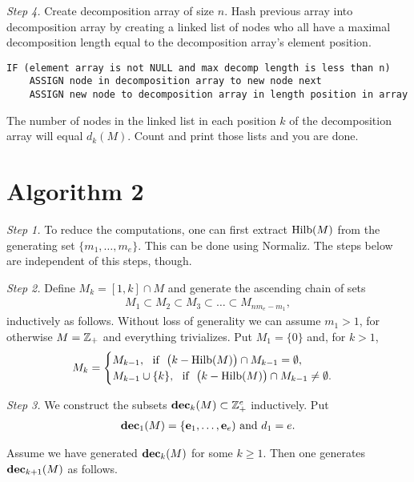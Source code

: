 \medskip\noindent\emph{Step 4.} Create decomposition array of size $n$. Hash previous array into decomposition array by creating a linked list of nodes who all have a maximal decomposition length equal to the decomposition array's element position. 

\begin{verbatim}
IF (element array is not NULL and max decomp length is less than n)
    ASSIGN node in decomposition array to new node next
    ASSIGN new node to decomposition array in length position in array
\end{verbatim}

The number of nodes in the linked list in each position $k$ of the decomposition array will equal $d_k(M)$. Count and print those lists and you are done. 

\section{Algorithm 2}\label{Algorithm 2}


\medskip\noindent\emph{Step 1.} To reduce the computations, one can first extract $\operatorname{Hilb}(M)$ from the generating set $\{m_1,\ldots,m_e\}$. This can be done using \textsf{Normaliz}. The steps below are independent of this steps, though.

\medskip\noindent\emph{Step 2.} Define $M_k=[1,k]\cap M$ and generate the ascending chain of sets
\begin{align*}
M_1\subset M_2\subset M_3\subset\ldots\subset M_{nm_e-m_1},
\end{align*}
inductively as follows. Without loss of generality we can assume $m_1>1$, for otherwise $M=\mathbb Z_+$ and everything trivializes. Put $M_1=\{0\}$ and, for $k>1$,
\begin{align*}
M_k=
\begin{cases}
M_{k-1},\ \ \text{if}\ \ \big(k-\operatorname{Hilb}(M)\big)\cap M_{k-1}=\emptyset,\\
M_{k-1}\cup\{k\},\ \ \text{if}\ \ \big(k-\operatorname{Hilb}(M)\big)\cap M_{k-1}\not=\emptyset.
\end{cases}
\end{align*}

\medskip\noindent\emph{Step 3.} We construct the subsets $\textbf{dec}_k(M)\subset\mathbb Z^e_+$ inductively. Put
\begin{align*}
\textbf{dec}_1(M)=\{\mathbf{e}_1,\ldots,\mathbf{e}_e)\ \text{and}\ d_1=e.
\end{align*}

Assume we have generated $\textbf{dec}_k(M)$ for some $k\ge1$. Then one generates $\textbf{dec}_{k+1}(M)$ as follows.

